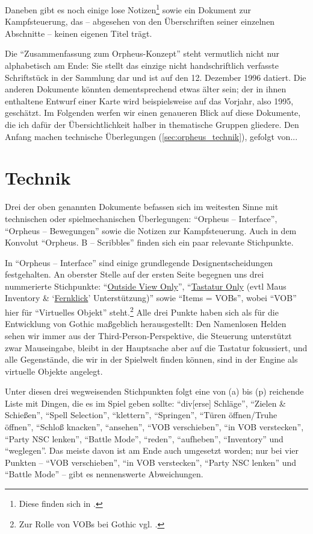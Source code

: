 \documentclass[12pt]{scrbook}
\begin{document}
\noindent Daneben gibt es noch einige lose Notizen\footnote{Diese finden sich in \autocite{orpheus_b_scribbles}.} sowie ein Dokument zur Kampfsteuerung,\autocite{orpheus_kampfsteuerung} das -- abgesehen von den Überschriften seiner einzelnen Abschnitte -- keinen eigenen Titel trägt.

Die \enquote{Zusammenfassung zum Orpheus-Konzept} steht vermutlich nicht nur alphabetisch am Ende: Sie stellt das einzige nicht handschriftlich verfasste Schriftstück in der Sammlung dar und ist auf den 12. Dezember 1996 datiert.
Die anderen Dokumente könnten dementsprechend etwas älter sein; der in ihnen enthaltene Entwurf einer Karte wird beispielsweise auf das Vorjahr, also 1995, geschätzt.\autocite{flosha_evolution}
Im Folgenden werfen wir einen genaueren Blick auf diese Dokumente, die ich dafür der Übersichtlichkeit halber in thematische Gruppen gliedere.
Den Anfang machen technische Überlegungen (\autoref{sec:orpheus_technik}), gefolgt von...


\section{Technik}\label{sec:orpheus_technik}
Drei der oben genannten Dokumente befassen sich im weitesten Sinne mit technischen oder spielmechanischen Überlegungen: \enquote{Orpheus -- Interface}, \enquote{Orpheus -- Bewegungen} sowie die Notizen zur Kampfsteuerung.
Auch in dem Konvolut \enquote{Orpheus. B -- Scribbles} finden sich ein paar relevante Stichpunkte.

In \enquote{Orpheus -- Interface} sind einige grundlegende Designentscheidungen festgehalten.
An oberster Stelle auf der ersten Seite begegnen uns drei nummerierte Stichpunkte: \enquote{\ul{Outside View Only}}, \enquote{\ul{Tastatur Only} (evtl Maus Inventory \& \enquote{\ul{Fernklick}} Unterstützung)} sowie \enquote{Items = VOBs},\autocite[S.~1]{orpheus_interface} wobei \enquote{VOB} hier für \enquote{Virtuelles Objekt} steht.\footnote{Zur Rolle von VOBs bei Gothic vgl. \autocite{wiki_vob}.}
Alle drei Punkte haben sich als für die Entwicklung von Gothic maßgeblich herausgestellt: Den Namenlosen Helden sehen wir immer aus der Third-Person-Perspektive, die Steuerung unterstützt zwar Mauseingabe, bleibt in der Hauptsache aber auf die Tastatur fokussiert, und alle Gegenstände, die wir in der Spielwelt finden können, sind in der Engine als virtuelle Objekte angelegt.

Unter diesen drei wegweisenden Stichpunkten folgt eine von (a) bis (p) reichende Liste mit Dingen, die es im Spiel geben sollte: \enquote{div[erse] Schläge}, \enquote{Zielen \& Schießen}, \enquote{Spell Selection}, \enquote{klettern}, \enquote{Springen}, \enquote{Türen öffnen/Truhe öffnen}, \enquote{Schloß knacken}, \enquote{ansehen}, \enquote{VOB verschieben}, \enquote{in VOB verstecken}, \enquote{Party NSC lenken}, \enquote{Battle Mode}, \enquote{reden}, \enquote{aufheben}, \enquote{Inventory} und \enquote{weglegen}.\autocite[S.~1]{orpheus_interface}
Das meiste davon ist am Ende auch umgesetzt worden; nur bei vier Punkten -- \enquote{VOB verschieben}, \enquote{in VOB verstecken}, \enquote{Party NSC lenken} und \enquote{Battle Mode} -- gibt es nennenswerte Abweichungen.


\clearpage
\appendix


\clearpage
\printbibliography
\end{document}
